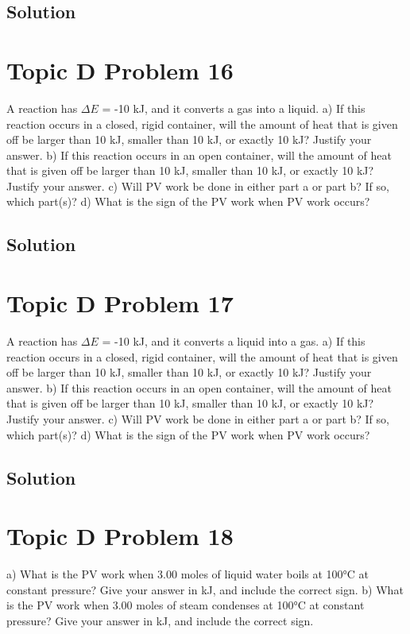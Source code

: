 \documentclass[10pt]{article}
\begin{document}
        \subsection{Solution}

    \pagebreak
    \section{Topic D Problem 16}
        A reaction has $\Delta E$ = -10 kJ, and it converts a gas into a liquid.
a) If this reaction occurs in a closed, rigid container, will the amount of heat that is given off
be larger than 10 kJ, smaller than 10 kJ, or exactly 10 kJ? Justify your answer.
b) If this reaction occurs in an open container, will the amount of heat that is given off be
larger than 10 kJ, smaller than 10 kJ, or exactly 10 kJ? Justify your answer.
c) Will PV work be done in either part a or part b? If so, which part(s)?
d) What is the sign of the PV work when PV work occurs?
        
        \subsection{Solution}

    \pagebreak
    \section{Topic D Problem 17}
        A reaction has $\Delta E$ = -10 kJ, and it converts a liquid into a gas.
a) If this reaction occurs in a closed, rigid container, will the amount of heat that is given off
be larger than 10 kJ, smaller than 10 kJ, or exactly 10 kJ? Justify your answer.
b) If this reaction occurs in an open container, will the amount of heat that is given off be
larger than 10 kJ, smaller than 10 kJ, or exactly 10 kJ? Justify your answer.
c) Will PV work be done in either part a or part b? If so, which part(s)?
d) What is the sign of the PV work when PV work occurs?
        
        \subsection{Solution}

    \pagebreak
    \section{Topic D Problem 18}
        a) What is the PV work when 3.00 moles of liquid water boils at 100\unit{\celsius} at constant pressure?
Give your answer in kJ, and include the correct sign.
b) What is the PV work when 3.00 moles of steam condenses at 100\unit{\celsius} at constant pressure?
Give your answer in kJ, and include the correct sign.
\end{document}
